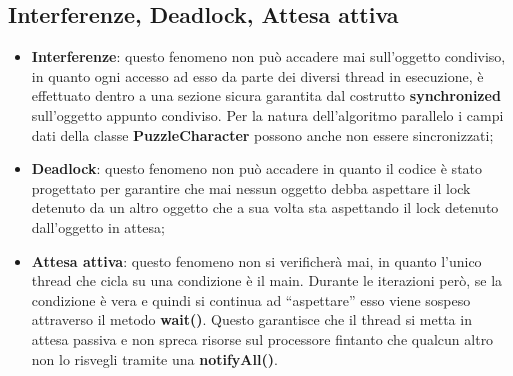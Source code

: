 	\subsection{Interferenze, Deadlock, Attesa attiva} %
	\label{sub:interferenze_deadlock_attesa_attiva}
		\begin{itemize}
			\item \textbf{Interferenze}: questo fenomeno non può accadere mai sull'oggetto condiviso, in quanto ogni accesso ad esso da parte dei diversi thread in esecuzione, è effettuato dentro a una sezione sicura garantita dal costrutto \textbf{synchronized} sull'oggetto appunto condiviso. Per la natura dell'algoritmo parallelo i campi dati della classe \textbf{PuzzleCharacter} possono anche non essere sincronizzati;
			\item \textbf{Deadlock}: questo fenomeno non può accadere in quanto il codice è stato progettato per garantire che mai nessun oggetto debba aspettare il lock detenuto da un altro oggetto che a sua volta sta aspettando il lock detenuto dall'oggetto in attesa;
			\item \textbf{Attesa attiva}: questo fenomeno non si verificherà mai, in quanto l'unico thread che cicla su una condizione è il main. Durante le iterazioni però, se la condizione è vera e quindi si continua ad ``aspettare'' esso viene sospeso attraverso il metodo \textbf{wait()}. Questo garantisce che il thread si metta in attesa passiva e non spreca risorse sul processore fintanto che qualcun altro non lo risvegli tramite una \textbf{notifyAll()}.
		\end{itemize}
	



